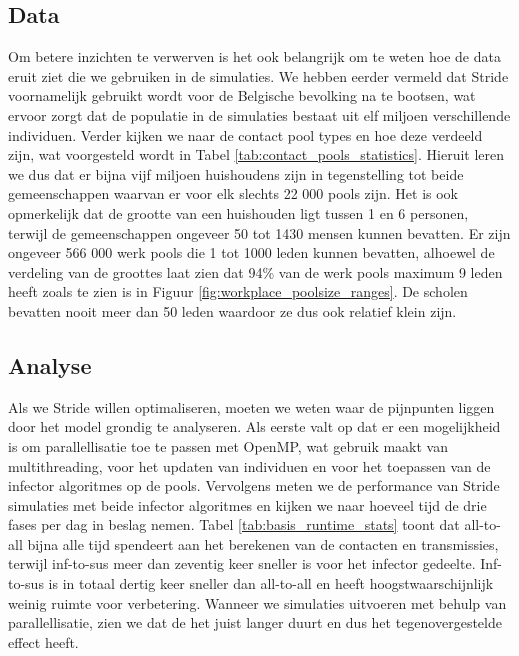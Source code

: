 \begin{appendices}
\subsection{Data}
Om betere inzichten te verwerven is het ook belangrijk om te weten hoe de data eruit ziet die we gebruiken in de simulaties. We hebben eerder vermeld dat Stride voornamelijk gebruikt wordt voor de Belgische bevolking na te bootsen, wat ervoor zorgt dat de populatie in de simulaties bestaat uit elf miljoen verschillende individuen. Verder kijken we naar de contact pool types en hoe deze verdeeld zijn, wat voorgesteld wordt in Tabel \ref{tab:contact_pools_statistics}. Hieruit leren we dus dat er bijna vijf miljoen huishoudens zijn in tegenstelling tot beide gemeenschappen waarvan er voor elk slechts 22 000 pools zijn. Het is ook opmerkelijk dat de grootte van een huishouden ligt tussen 1 en 6 personen, terwijl de gemeenschappen ongeveer 50 tot 1430 mensen kunnen bevatten. Er zijn ongeveer 566 000 werk pools die 1 tot 1000 leden kunnen bevatten, alhoewel de verdeling van de groottes laat zien dat 94\% van de werk pools maximum 9 leden heeft zoals te zien is in Figuur \ref{fig:workplace_poolsize_ranges}. De scholen bevatten nooit meer dan 50 leden waardoor ze dus ook relatief klein zijn.

\subsection{Analyse}
Als we Stride willen optimaliseren, moeten we weten waar de pijnpunten liggen door het model grondig te analyseren. Als eerste valt op dat er een mogelijkheid is om parallellisatie toe te passen met OpenMP, wat gebruik maakt van multithreading, voor het updaten van individuen en voor het toepassen van de infector algoritmes op de pools. Vervolgens meten we de performance van Stride simulaties met beide infector algoritmes en kijken we naar hoeveel tijd de drie fases per dag in beslag nemen. Tabel \ref{tab:basis_runtime_stats} toont dat all-to-all bijna alle tijd spendeert aan het berekenen van de contacten en transmissies, terwijl inf-to-sus meer dan zeventig keer sneller is voor het infector gedeelte. Inf-to-sus is in totaal dertig keer sneller dan all-to-all en heeft hoogstwaarschijnlijk weinig ruimte voor verbetering. Wanneer we simulaties uitvoeren met behulp van parallellisatie, zien we dat de het juist langer duurt en dus het tegenovergestelde effect heeft.


\end{appendices}
